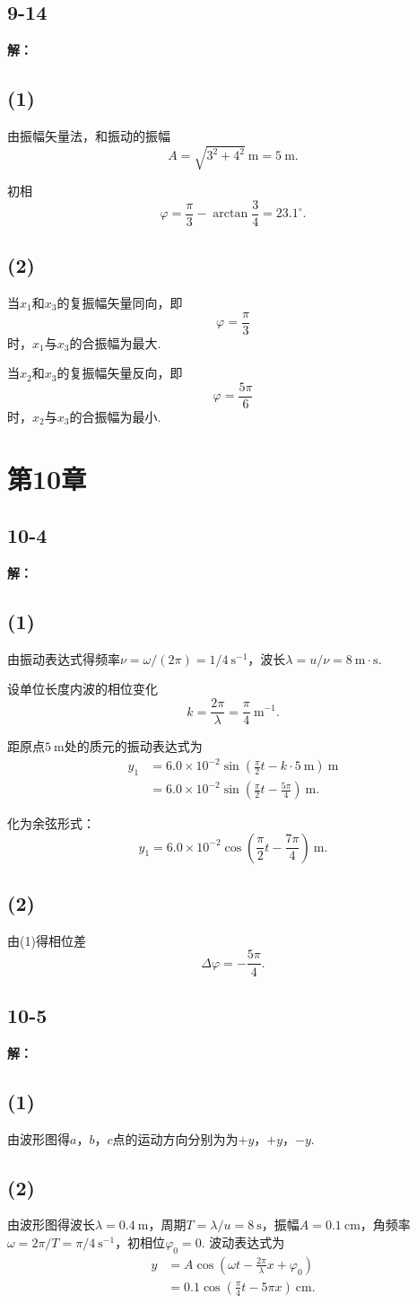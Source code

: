 \documentclass[twocolumn]{ctexart}
\newcommand{\sol}[1]{\subsection*{#1}\noindent\textbf{解：}
	
}
\newcommand{\un}[1]{\ \mathrm{#1}}
\begin{document}
\sol{9-14}
\subsection*{(1)}
由振幅矢量法，和振动的振幅
$$A=\sqrt{3^2+4^2}\ \mathrm m=5\ \mathrm m.$$

初相
$$\varphi=\frac{\pi}{3}-\arctan\frac{3}{4}=23.1^\circ{}.$$

\subsection*{(2)}
当$x_1$和$x_3$的复振幅矢量同向，即
$$\varphi=\frac{\pi}{3}$$
时，$x_1$与$x_3$的合振幅为最大.

当$x_2$和$x_3$的复振幅矢量反向，即
$$\varphi=\frac{5\pi}{6}$$
时，$x_2$与$x_3$的合振幅为最小.

\section*{第10章}

\sol{10-4}
\subsection*{(1)}
由振动表达式得频率$\nu=\omega/(2\pi)=1/4\un{s^{-1}}$，波长$\lambda=u/\nu=8\un{m\cdot s}$.

设单位长度内波的相位变化
$$k=\frac{2\pi}{\lambda}=\frac{\pi}{4}\un{m^{-1}}.$$

距原点$5\un m$处的质元的振动表达式为
\begin{align*}
	y_1&=6.0\times10^{-2}\sin\left(\frac{\pi}{2}t-k\cdot 5\un m\right)\un m\\
	&=6.0\times10^{-2}\sin\left(\frac{\pi}{2}t-\frac{5\pi}{4}\right)\un m.
\end{align*}

化为余弦形式：
$$y_1=6.0\times10^{-2}\cos\left(\frac{\pi}{2}t-\frac{7\pi}{4}\right)\un m.$$
\subsection*{(2)}
由(1)得相位差
$$\Delta\varphi=-\frac{5\pi}{4}.$$

\sol{10-5}
\subsection*{(1)}
由波形图得$a$，$b$，$c$点的运动方向分别为为$+y$，$+y$，$-y$.

\subsection*{(2)}
由波形图得波长$\lambda=0.4\un m$，周期$T=\lambda/u=8\un s$，振幅$A=0.1\un{cm}$，角频率$\omega=2\pi/T=\pi/4\un{s^{-1}}$，初相位$\varphi_0=0$. 波动表达式为
\begin{align*}
	y&=A\cos\left(\omega t-\frac{2\pi}{\lambda}x+\varphi_0\right)\\
	&=0.1\cos\left(\frac{\pi}{4}t-5\pi x\right)\un{cm}.
\end{align*}
\end{document}
